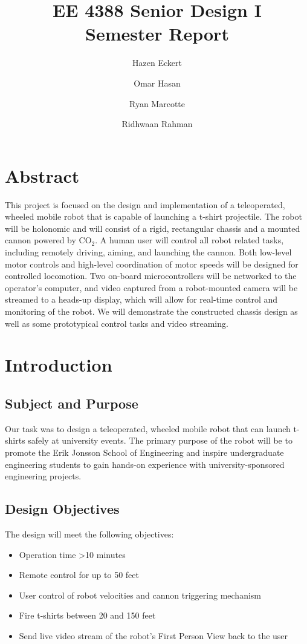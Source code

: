 \documentclass[letterpaper,12pt]{article}
\begin{document}
\title{EE 4388 Senior Design I\\Semester Report}
\author{Hazen Eckert \and Omar Hasan \and Ryan Marcotte \and Ridhwaan Rahman}
\maketitle
\tableofcontents
\newpage

\section{Abstract}
\noindent This project is focused on the design and implementation of a
teleoperated, wheeled mobile robot that is capable of launching a t-shirt
projectile. The robot will be holonomic and will consist of a rigid, rectangular
chassis and a mounted cannon powered by $\textrm{CO}_2$. A human user will
control all robot related tasks, including remotely driving, aiming, and
launching the cannon. Both low-level motor controls and high-level coordination
of motor speeds will be designed for controlled locomotion. Two on-board
microcontrollers will be networked to the operator's computer, and video
captured from a robot-mounted camera will be streamed to a heads-up display,
which will allow for real-time control and monitoring of the robot. We will
demonstrate the constructed chassis design as well as some prototypical control
tasks and video streaming.

\section{Introduction}

\subsection{Subject and Purpose}
\noindent Our task was to design a teleoperated, wheeled mobile robot that can
launch t-shirts safely at university events. The primary purpose of the robot
will be to promote the Erik Jonsson School of Engineering and inspire
undergraduate engineering students to gain hands-on experience with
university-sponsored engineering projects.

\subsection{Design Objectives}
\noindent The design will meet the following objectives:
\begin{itemize}
    \item Operation time \textgreater 10 minutes
    \item Remote control for up to 50 feet
    \item User control of robot velocities and cannon triggering mechanism
    \item Fire t-shirts between 20 and 150 feet
    \item Send live video stream of the robot's First Person View back to the user
\end{itemize}
\end{document}

